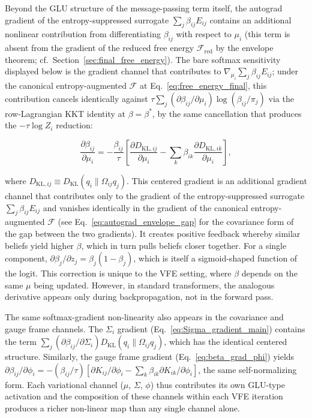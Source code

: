 \documentclass[twoside,11pt]{article}
\begin{document}
Beyond the GLU structure of the message-passing term itself, the autograd gradient of the entropy-suppressed surrogate $\sum_j \beta_{ij} E_{ij}$ contains an additional nonlinear contribution from differentiating $\beta_{ij}$ with respect to $\mu_i$ (this term is absent from the gradient of the reduced free energy $\mathcal{F}_{\mathrm{red}}$ by the envelope theorem; cf.\ Section~\ref{sec:final_free_energy}). The bare softmax sensitivity displayed below is the gradient channel that contributes to $\nabla_{\mu_i} \sum_j \beta_{ij} E_{ij}$; under the canonical entropy-augmented $\mathcal{F}$ at Eq.~\eqref{eq:free_energy_final}, this contribution cancels identically against $\tau \sum_j (\partial\beta_{ij}/\partial\mu_i) \log(\beta_{ij}/\pi_j)$ via the row-Lagrangian KKT identity at $\beta = \beta^*$, by the same cancellation that produces the $-\tau\log Z_i$ reduction:

\begin{equation}
\frac{\partial \beta_{ij}}{\partial \mu_i} = -\frac{\beta_{ij}}{\tau}\left[\frac{\partial D_{\mathrm{KL},ij}}{\partial \mu_i} - \sum_k \beta_{ik} \frac{\partial D_{\mathrm{KL},ik}}{\partial \mu_i}\right],
\label{eq:softmax_gradient_nonlinearity}
\end{equation}

where $D_{\mathrm{KL},ij} \equiv D_{\mathrm{KL}}(q_i \| \Omega_{ij} q_j)$. This centered gradient is an additional gradient channel that contributes only to the gradient of the entropy-suppressed surrogate $\sum_j \beta_{ij} E_{ij}$ and vanishes identically in the gradient of the canonical entropy-augmented $\mathcal{F}$ (see Eq.~\eqref{eq:autograd_envelope_gap} for the covariance form of the gap between the two gradients). It creates positive feedback whereby similar beliefs yield higher $\beta$, which in turn pulls beliefs closer together. For a single component, $\partial \beta_j / \partial z_j = \beta_j(1 - \beta_j)$, which is itself a sigmoid-shaped function of the logit. This correction is unique to the VFE setting, where $\beta$ depends on the same $\mu$ being updated. However, in standard transformers, the analogous derivative appears only during backpropagation, not in the forward pass.

The same softmax-gradient non-linearity also appears in the covariance and gauge frame channels. The $\Sigma_i$ gradient (Eq.~\ref{eq:Sigma_gradient_main}) contains the term $\sum_j (\partial \beta_{ij}/\partial \Sigma_i) D_{\mathrm{KL}}(q_i \| \Omega_{ij} q_j)$, which has the identical centered structure. Similarly, the gauge frame gradient (Eq.~\ref{eq:beta_grad_phi}) yields $\partial \beta_{ij}/\partial \phi_i = -(\beta_{ij}/\tau)[\partial K_{ij}/\partial \phi_i - \sum_k \beta_{ik} \partial K_{ik}/\partial \phi_i]$, the same self-normalizing form. Each variational channel ($\mu$, $\Sigma$, $\phi$) thus contributes its own GLU-type activation and the composition of these channels within each VFE iteration produces a richer non-linear map than any single channel alone.
\end{document}
